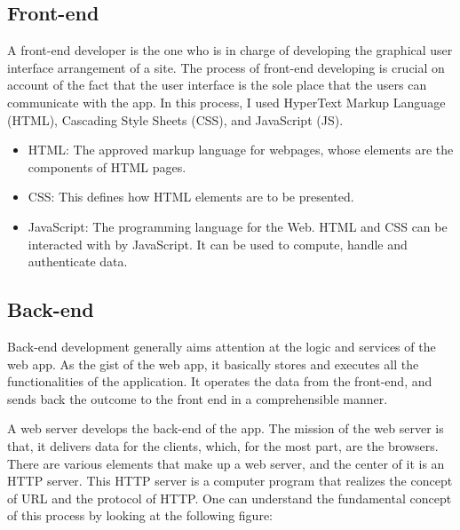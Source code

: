 \documentclass[a4paper, 11pt,openany]{book} %
\begin{document}
\subsection{Front-end}
A front-end developer is the one who is in charge of developing the graphical user interface arrangement of a site. The process of front-end developing is crucial on account of the fact that the user interface is the sole place that the users can communicate with the app. In this process, I used
HyperText Markup Language (HTML), Cascading Style Sheets (CSS), and JavaScript (JS).\par

\begin{itemize}
    \item HTML: The approved markup language for webpages, whose elements  are the components of HTML pages.\cite{html}
    \item CSS: This defines how HTML elements are to be presented. \cite{css}
    \item JavaScript: The programming language for the Web. HTML and CSS can be interacted with by JavaScript. It can be used to compute, handle and authenticate data. \cite{js}
\end{itemize}

\subsection{Back-end}
Back-end development generally aims attention at the logic and services of the web app. As the gist of the web app, it basically stores and executes all the functionalities of the application. It operates the data from the front-end, and sends back the outcome to the front end in a comprehensible manner. \par

A web server develops the back-end of the app. The mission of the web server is that, it delivers data for the clients, which, for the most part, are the browsers. There are various elements that make up a web server, and the center of it is an HTTP server. This HTTP server is a computer program that realizes the concept of URL and the protocol of HTTP. One can understand the fundamental concept of this process by looking at the following figure:
\end{document}
